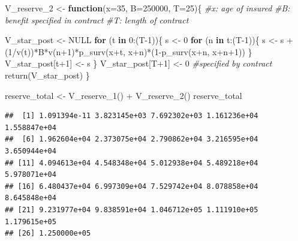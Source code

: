 \documentclass[
]{article}
\newenvironment{Shaded}{\begin{snugshade}}{\end{snugshade}}
\newcommand{\AttributeTok}[1]{\textcolor[rgb]{0.77,0.63,0.00}{#1}}
\newcommand{\CommentTok}[1]{\textcolor[rgb]{0.56,0.35,0.01}{\textit{#1}}}
\newcommand{\ConstantTok}[1]{\textcolor[rgb]{0.00,0.00,0.00}{#1}}
\newcommand{\ControlFlowTok}[1]{\textcolor[rgb]{0.13,0.29,0.53}{\textbf{#1}}}
\newcommand{\DecValTok}[1]{\textcolor[rgb]{0.00,0.00,0.81}{#1}}
\newcommand{\FunctionTok}[1]{\textcolor[rgb]{0.00,0.00,0.00}{#1}}
\newcommand{\NormalTok}[1]{#1}
\newcommand{\OtherTok}[1]{\textcolor[rgb]{0.56,0.35,0.01}{#1}}
\newcommand{\SpecialCharTok}[1]{\textcolor[rgb]{0.00,0.00,0.00}{#1}}
\begin{document}
\begin{Shaded}
\begin{Highlighting}[]
\NormalTok{V\_reserve\_2 }\OtherTok{\textless{}{-}} \ControlFlowTok{function}\NormalTok{(}\AttributeTok{x=}\DecValTok{35}\NormalTok{, }\AttributeTok{B=}\DecValTok{250000}\NormalTok{, }\AttributeTok{T=}\DecValTok{25}\NormalTok{)\{}
  \CommentTok{\#x: age of insured}
  \CommentTok{\#B: benefit specified in contract}
  \CommentTok{\#T: length of contract }
  
\NormalTok{  V\_star\_post }\OtherTok{\textless{}{-}} \ConstantTok{NULL}
  \ControlFlowTok{for}\NormalTok{ (t }\ControlFlowTok{in} \DecValTok{0}\SpecialCharTok{:}\NormalTok{(T}\DecValTok{{-}1}\NormalTok{))\{}
\NormalTok{    s }\OtherTok{\textless{}{-}} \DecValTok{0} 
    \ControlFlowTok{for}\NormalTok{ (n }\ControlFlowTok{in}\NormalTok{ t}\SpecialCharTok{:}\NormalTok{(T}\DecValTok{{-}1}\NormalTok{))\{}
\NormalTok{      s }\OtherTok{\textless{}{-}}\NormalTok{ s }\SpecialCharTok{+}\NormalTok{ (}\DecValTok{1}\SpecialCharTok{/}\FunctionTok{v}\NormalTok{(t))}\SpecialCharTok{*}\NormalTok{B}\SpecialCharTok{*}\FunctionTok{v}\NormalTok{(n}\SpecialCharTok{+}\DecValTok{1}\NormalTok{)}\SpecialCharTok{*}\FunctionTok{p\_surv}\NormalTok{(x}\SpecialCharTok{+}\NormalTok{t, x}\SpecialCharTok{+}\NormalTok{n)}\SpecialCharTok{*}\NormalTok{(}\DecValTok{1}\SpecialCharTok{{-}}\FunctionTok{p\_surv}\NormalTok{(x}\SpecialCharTok{+}\NormalTok{n, x}\SpecialCharTok{+}\NormalTok{n}\SpecialCharTok{+}\DecValTok{1}\NormalTok{))}
\NormalTok{    \}}
\NormalTok{    V\_star\_post[t}\SpecialCharTok{+}\DecValTok{1}\NormalTok{] }\OtherTok{\textless{}{-}}\NormalTok{ s }
\NormalTok{  \}}
\NormalTok{  V\_star\_post[T}\SpecialCharTok{+}\DecValTok{1}\NormalTok{] }\OtherTok{\textless{}{-}} \DecValTok{0} \CommentTok{\#specified by contract}
  \FunctionTok{return}\NormalTok{(V\_star\_post)}
\NormalTok{\}}

\NormalTok{reserve\_total }\OtherTok{\textless{}{-}} \FunctionTok{V\_reserve\_1}\NormalTok{() }\SpecialCharTok{+} \FunctionTok{V\_reserve\_2}\NormalTok{()}
\NormalTok{reserve\_total}
\end{Highlighting}
\end{Shaded}

\begin{verbatim}
##  [1] 1.091394e-11 3.823145e+03 7.692302e+03 1.161236e+04 1.558847e+04
##  [6] 1.962604e+04 2.373075e+04 2.790862e+04 3.216595e+04 3.650944e+04
## [11] 4.094613e+04 4.548348e+04 5.012938e+04 5.489218e+04 5.978071e+04
## [16] 6.480437e+04 6.997309e+04 7.529742e+04 8.078858e+04 8.645848e+04
## [21] 9.231977e+04 9.838591e+04 1.046712e+05 1.111910e+05 1.179615e+05
## [26] 1.250000e+05
\end{verbatim}
\end{document}
